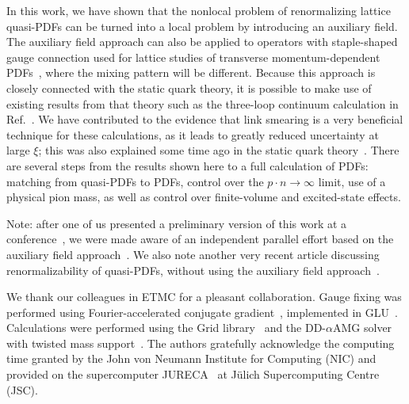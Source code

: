 \documentclass[prl,reprint,notitlepage,nofootinbib]{revtex4-1}
\begin{document}
In this work, we have shown that the nonlocal problem of renormalizing
lattice quasi-PDFs can be turned into a local problem by introducing
an auxiliary field. The auxiliary field approach can also be applied
to operators with staple-shaped gauge connection used for lattice
studies of transverse momentum-dependent
PDFs~\cite{Musch:2011er,Engelhardt:2015xja,Yoon:2017qzo}, where the
mixing pattern will be different. Because this approach is closely
connected with the static quark theory, it is possible to make use of
existing results from that theory such as the three-loop continuum
calculation in Ref.~\cite{Chetyrkin:2003vi}. We have contributed to
the evidence that link smearing is a very beneficial technique for
these calculations, as it leads to greatly reduced uncertainty at
large $\xi$; this was also explained some time ago in the static quark
theory~\cite{DellaMorte:2003mn}. There are several steps from the
results shown here to a full calculation of PDFs: matching from
quasi-PDFs to PDFs, control
over the $p\cdot n\to\infty$ limit, use of a physical pion mass, as
well as control over finite-volume and excited-state effects.

Note: after one of us presented a preliminary version of this work at
a conference~\cite{Green_Lat2017}, we were made aware of an
independent parallel effort based on the auxiliary field
approach~\cite{Ji:2017oey}. We also note another very recent article
discussing renormalizability of quasi-PDFs, without using the
auxiliary field approach~\cite{Ishikawa:2017faj}.


\begin{acknowledgments}
  We thank our colleagues in ETMC for a pleasant collaboration.
  Gauge fixing was performed using
  Fourier-accelerated conjugate gradient~\cite{Hudspith:2014oja},
  implemented in GLU~\cite{GLU}. Calculations were performed using the
  Grid library~\cite{Boyle:2016lbp} and the DD-$\alpha$AMG
  solver~\cite{Frommer:2013fsa} with twisted mass
  support~\cite{Alexandrou:2016izb}. The authors gratefully
  acknowledge the computing time granted by the John von Neumann
  Institute for Computing (NIC) and provided on the supercomputer
  JURECA~\cite{jureca} at Jülich Supercomputing Centre (JSC).
\end{acknowledgments}



\end{document}
